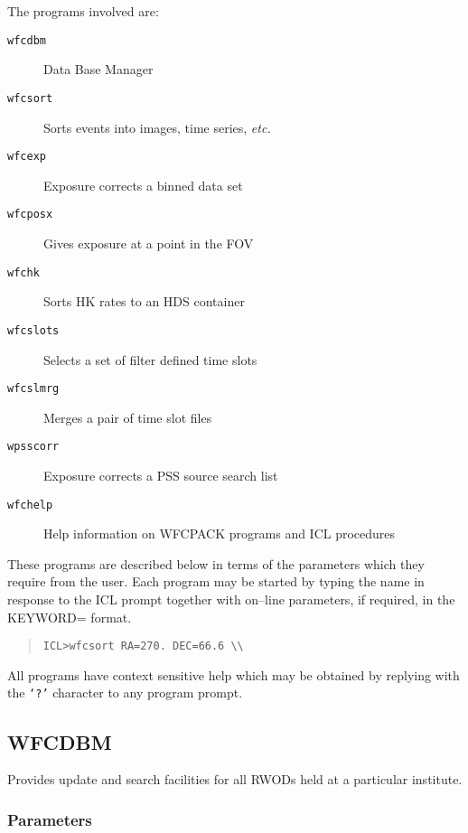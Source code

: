 The programs involved are:

\begin{description}
\item [{\tt wfcdbm}]   Data Base Manager
\item [{\tt wfcsort}]  Sorts events into images, time series, {\em etc.}
\item [{\tt wfcexp}]   Exposure corrects a binned data set
\item [{\tt wfcposx}]  Gives exposure at a point in the FOV
\item [{\tt wfchk}]    Sorts HK rates to an HDS container
\item [{\tt wfcslots}] Selects a set of filter defined time slots
\item [{\tt wfcslmrg}] Merges a pair of time slot files
\item [{\tt wpsscorr}] Exposure corrects a PSS source search list
\item [{\tt wfchelp}]  Help information on WFCPACK programs and ICL procedures
\end{description}

These programs are described below in terms of the parameters which
they require from the user.  Each program may be started by typing the
name in response to the ICL prompt together with on--line parameters,
if required, in the KEYWORD= format.

\begin{quote}
{\tt ICL\verb+>+wfcsort RA=270. DEC=66.6 \verb+\\+}
\end{quote}

All programs have context sensitive help which may be obtained by
replying with the {\tt `?'} character to any program prompt.

\subsection{WFCDBM}
\label{sec:programs:wfcdbm}

Provides update and search facilities for all RWODs held at a particular
institute.

\subsubsection{Parameters}

